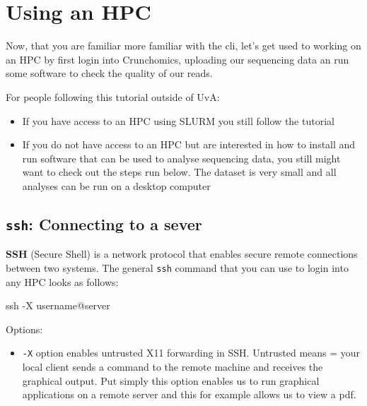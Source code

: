 \documentclass[
  letterpaper,
  DIV=11,
  numbers=noendperiod]{scrreprt}
\author{}
\date{}
\newenvironment{Shaded}{}{}
\newcommand{\AttributeTok}[1]{\textcolor[rgb]{0.84,0.23,0.29}{#1}}
\newcommand{\FunctionTok}[1]{\textcolor[rgb]{0.44,0.26,0.76}{#1}}
\newcommand{\NormalTok}[1]{\textcolor[rgb]{0.14,0.16,0.18}{#1}}
\providecommand{\tightlist}{%
  \setlength{\itemsep}{0pt}\setlength{\parskip}{0pt}}\usepackage{longtable,booktabs,array}
\renewcommand*\contentsname{Table of contents}
\newcommand\contentsname{Table of contents}
\begin{document}

\renewcommand*\contentsname{Table of contents}
{
\hypersetup{linkcolor=}
\setcounter{tocdepth}{2}
\tableofcontents
}
\chapter{Using an HPC}\label{using-an-hpc}

Now, that you are familiar more familiar with the cli, let's get used to
working on an HPC by first login into Crunchomics, uploading our
sequencing data an run some software to check the quality of our reads.

For people following this tutorial outside of UvA:

\begin{itemize}
\item
  If you have access to an HPC using SLURM you still follow the tutorial
\item
  If you do not have access to an HPC but are interested in how to
  install and run software that can be used to analyse sequencing data,
  you still might want to check out the steps run below. The dataset is
  very small and all analyses can be run on a desktop computer
\end{itemize}

\section{\texorpdfstring{\texttt{ssh}: Connecting to a
sever}{ssh: Connecting to a sever}}\label{ssh-connecting-to-a-sever}

\textbf{SSH} (Secure Shell) is a network protocol that enables secure
remote connections between two systems. The general \texttt{ssh} command
that you can use to login into any HPC looks as follows:

\begin{Shaded}
\begin{Highlighting}[]
\FunctionTok{ssh} \AttributeTok{{-}X}\NormalTok{ username@server}
\end{Highlighting}
\end{Shaded}

Options:

\begin{itemize}
\tightlist
\item
  \texttt{-X} option enables untrusted X11 forwarding in SSH. Untrusted
  means = your local client sends a command to the remote machine and
  receives the graphical output. Put simply this option enables us to
  run graphical applications on a remote server and this for example
  allows us to view a pdf.
\end{itemize}
\end{document}
